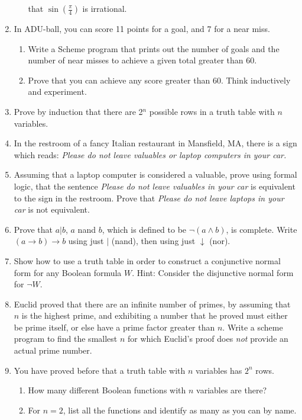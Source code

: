 \documentclass{article}
\begin{document}
\begin{enumerate}
\begin{enumerate}
        that $\sin (\frac{\pi}{4})$ is irrational.
    \end{enumerate}
\item
    In ADU-ball, you can score 11 points for a goal, and 7 for a
    near miss. \\
    \begin{enumerate}
    \item
    Write a Scheme program that prints out the number of goals and
    the number of near misses to achieve a given total greater than
    60.\\
    \item Prove that you can achieve any score greater than 60. Think
    inductively and experiment.
    \end{enumerate}
\item Prove by induction that there are 2$^{\mathit{n}}$ possible
      rows in a truth table with  $ n$ variables.
\item   In the restroom of a fancy Italian restaurant in Mansfield,
        MA, there is a sign which reads:  {\em Please do not leave
        valuables or laptop computers in your car.}
\item   Assuming that a laptop computer is considered a valuable, prove
        using formal logic, that the sentence  {\em Please do not leave
        valuables in your car} is equivalent to the sign in the restroom.
        Prove that  {\em Please do not leave laptops in your car} is not
        equivalent.
\item   Prove that $a | b$, $a$
        nand $b$, which is defined to be
    $\neg (a \wedge b)$, is
    complete. Write
    $( a \rightarrow b) \rightarrow b$
    using just $|$ (nand), then using just
    $\downarrow$ (nor).

\item
    Show how to use a truth table in order to construct a conjunctive
    normal form for any Boolean formula $W$. Hint: Consider the
    disjunctive normal form for $\neg W$.


\item
    Euclid proved that there are an infinite number of primes, by
    assuming that  $ n$ is the highest prime, and exhibiting a number
    that he proved must either be prime itself, or else have a prime
    factor greater than  $ n $. Write a scheme program to find
    the smallest  $ n$ for which Euclid's proof does
     {\em not} provide an actual prime number.

\item
    You have proved before that a truth table with $n$ variables
    has $2^{n}$ rows.
    \begin{enumerate}
    \item
    How many different Boolean functions with $n$ variables are
    there? \\
    \item For $n = 2$, list all the functions and identify as many as
    you can by name.
    \end{enumerate}


\end{enumerate}
\end{document}
